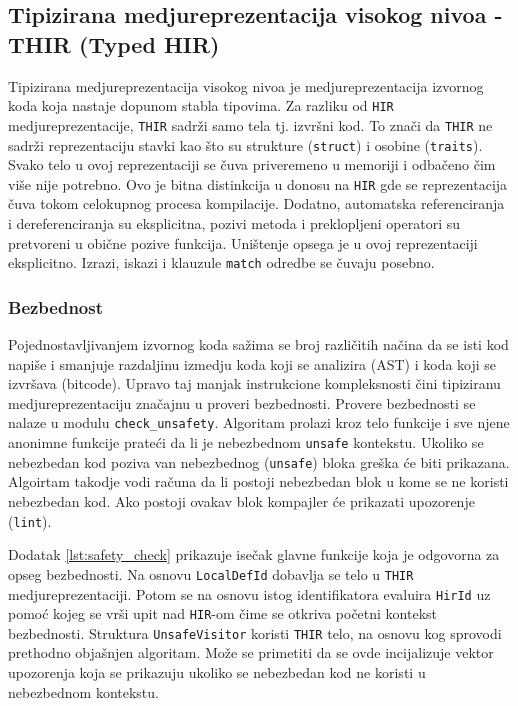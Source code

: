 \subsection{Tipizirana medjureprezentacija visokog nivoa - THIR (Typed HIR)}

Tipizirana medjureprezentacija visokog nivoa je medjureprezentacija izvornog koda koja nastaje dopunom stabla tipovima.
Za razliku od \verb|HIR| medjureprezentacije, \verb|THIR| sadrži samo tela tj. izvršni kod. To znači da \verb|THIR| 
ne sadrži reprezentaciju stavki kao što su strukture (\verb|struct|) i osobine (\verb|traits|). Svako telo u ovoj reprezentaciji
se čuva priveremeno u memoriji i odbačeno čim više nije potrebno. Ovo je bitna distinkcija u donosu na \verb|HIR| gde se reprezentacija 
čuva tokom celokupnog procesa kompilacije. Dodatno, automatska referenciranja i dereferenciranja su eksplicitna, pozivi metoda i 
preklopljeni operatori su pretvoreni u obične pozive funkcija. Uništenje opsega je u ovoj reprezentaciji eksplicitno.
Izrazi, iskazi i klauzule \verb|match| odredbe se čuvaju posebno.

\subsubsection{Bezbednost}

Pojednostavljivanjem izvornog koda sažima se broj različitih načina da se isti kod napiše i smanjuje razdaljinu izmedju 
koda koji se analizira (AST) i koda koji se izvršava (bitcode).
Upravo taj manjak instrukcione kompleksnosti čini tipiziranu medjureprezentaciju značajnu u proveri bezbednosti. 
Provere bezbednosti se nalaze u modulu \verb|check_unsafety|.
Algoritam prolazi kroz telo funkcije i sve njene anonimne funkcije prateći da li je nebezbednom \verb|unsafe| kontekstu.
Ukoliko se nebezbedan kod poziva van nebezbednog (\verb|unsafe|) bloka greška će biti prikazana. Algoirtam takodje vodi računa da li 
postoji nebezbedan blok u kome se ne koristi nebezbedan kod. Ako postoji ovakav blok kompajler će prikazati upozorenje (\verb|lint|).

Dodatak \ref{lst:safety_check} prikazuje isečak glavne funkcije koja je odgovorna za opseg bezbednosti. 
Na osnovu \verb|LocalDefId| dobavlja se telo u \verb|THIR| medjureprezentaciji. Potom se na osnovu istog 
identifikatora evaluira \verb|HirId| uz pomoć kojeg se vrši upit nad \verb|HIR|-om čime se otkriva početni kontekst bezbednosti.
Struktura \verb|UnsafeVisitor| koristi \verb|THIR| telo, na osnovu kog sprovodi prethodno objašnjen algoritam. Može se primetiti 
da se ovde incijalizuje vektor upozorenja koja se prikazuju ukoliko se nebezbedan kod ne koristi u nebezbednom kontekstu.

